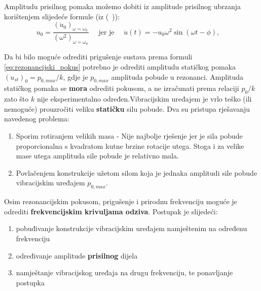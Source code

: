 Amplitudu prisilnog pomaka možemo dobiti iz amplitude prisilnog ubrzanja korištenjem
slijedeće formule (iz (~\cite{dk_skripta})):
\begin{equation}
    u_0=\frac{(\ddot{u}_0)_{\omega=\omega_n}}{(\omega^2)_{\omega=\omega_n}} \quad
    \text{ jer je } \quad
    \ddot{u}(t) = -u_0\omega^2\sin(\omega t -\phi), \quad
\end{equation}

Da bi bilo moguće odrediti prigušenje sustava prema formuli \eqref{eq:rezonancijski_pokus} 
potrebno je odrediti amplitudu statičkog pomaka $(u_{st})_0=p_{0,max}/k$, gdje je
$p_{0,max}$ amplituda pobude u rezonanci. Amplituda statičkog pomaka se
\textbf{mora} odrediti pokusom, a ne izračunati prema relaciji $p_0/k$ zato što $k$
nije eksperimentalno određen.Vibracijskim uređajem je vrlo teško (ili
nemoguće) prouzročiti veliku \textbf{statičku} silu pobude. Dva su pristupa rješavanju
navedenog problema:
\begin{enumerate}
    \item Sporim rotiranjem velikih masa - Nije najbolje rješenje jer je sila pobude
        proporcionalna s kvadratom kutne brzine rotacije utega. Stoga i za velike mase 
        utega amplituda sile pobude je relativno mala.
    \item Povlačenjem konstrukcije užetom silom koja je jednaka amplitudi sile
        pobude vibracijskim uređajem $p_{0,max}$.
\end{enumerate}

Osim rezonancijskim pokusom, prigušenje i prirodnu frekvenciju moguće je
odrediti \textbf{frekvencijskim krivuljama odziva}. Postupak je slijedeći:
\begin{enumerate}
    \item pobuđivanje konstrukcije vibracijskim uređajem namještenim na određenu
        frekvenciju
    \item određivanje amplitude \textbf{prisilnog} dijela 
    \item namještanje vibracijskog uređaja na drugu frekvenciju, te ponavljanje
        postupka%
\end{enumerate}

